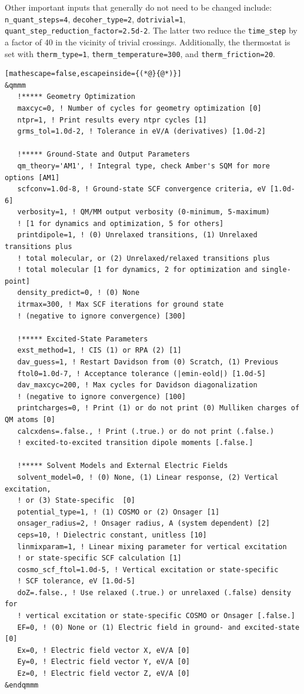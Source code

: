 \documentclass[letterpaper,12pt,titlepage]{article}
\begin{document}
\begin{appendix}
Other important inputs that generally do not need to be changed include: \verb+n_quant_steps=4+, \verb+decoher_type=2+, \verb+dotrivial=1+, \verb+quant_step_reduction_factor=2.5d-2+.  The latter two reduce the \verb+time_step+ by a factor of 40 in the vicinity of trivial crossings.  Additionally, the thermostat is set with \verb+therm_type=1+, \verb+therm_temperature=300+, and \verb+therm_friction=20+.
\begin{lstlisting}[mathescape=false,escapeinside={(*@}{@*)}]
&qmmm
   !***** Geometry Optimization
   maxcyc=0, ! Number of cycles for geometry optimization [0]
   ntpr=1, ! Print results every ntpr cycles [1]
   grms_tol=1.0d-2, ! Tolerance in eV/A (derivatives) [1.0d-2]

   !***** Ground-State and Output Parameters
   qm_theory='AM1', ! Integral type, check Amber's SQM for more options [AM1]
   scfconv=1.0d-8, ! Ground-state SCF convergence criteria, eV [1.0d-6]
   verbosity=1, ! QM/MM output verbosity (0-minimum, 5-maximum)
   ! [1 for dynamics and optimization, 5 for others]
   printdipole=1, ! (0) Unrelaxed transitions, (1) Unrelaxed transitions plus 
   ! total molecular, or (2) Unrelaxed/relaxed transitions plus 
   ! total molecular [1 for dynamics, 2 for optimization and single-point]
   density_predict=0, ! (0) None
   itrmax=300, ! Max SCF iterations for ground state 
   ! (negative to ignore convergence) [300]

   !***** Excited-State Parameters
   exst_method=1, ! CIS (1) or RPA (2) [1]
   dav_guess=1, ! Restart Davidson from (0) Scratch, (1) Previous
   ftol0=1.0d-7, ! Acceptance tolerance (|emin-eold|) [1.0d-5]
   dav_maxcyc=200, ! Max cycles for Davidson diagonalization 
   ! (negative to ignore convergence) [100]
   printcharges=0, ! Print (1) or do not print (0) Mulliken charges of QM atoms [0]
   calcxdens=.false., ! Print (.true.) or do not print (.false.) 
   ! excited-to-excited transition dipole moments [.false.]

   !***** Solvent Models and External Electric Fields
   solvent_model=0, ! (0) None, (1) Linear response, (2) Vertical excitation, 
   ! or (3) State-specific  [0]
   potential_type=1, ! (1) COSMO or (2) Onsager [1]
   onsager_radius=2, ! Onsager radius, A (system dependent) [2]
   ceps=10, ! Dielectric constant, unitless [10]
   linmixparam=1, ! Linear mixing parameter for vertical excitation
   ! or state-specific SCF calculation [1]
   cosmo_scf_ftol=1.0d-5, ! Vertical excitation or state-specific
   ! SCF tolerance, eV [1.0d-5]
   doZ=.false., ! Use relaxed (.true.) or unrelaxed (.false) density for 
   ! vertical excitation or state-specific COSMO or Onsager [.false.]
   EF=0, ! (0) None or (1) Electric field in ground- and excited-state [0]
   Ex=0, ! Electric field vector X, eV/A [0]
   Ey=0, ! Electric field vector Y, eV/A [0]
   Ez=0, ! Electric field vector Z, eV/A [0] 
&endqmmm


\end{lstlisting}
\end{appendix}
\end{document}

